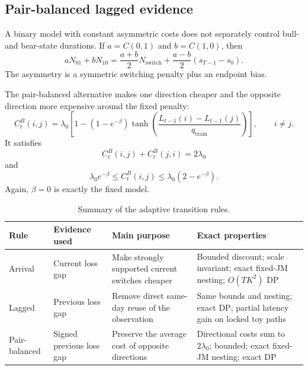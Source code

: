 \documentclass[11pt]{article}
\begin{document}
\subsection{Pair-balanced lagged evidence}

A binary model with constant asymmetric costs does not separately control bull- and bear-state durations. If $a=C(0,1)$ and $b=C(1,0)$, then
\begin{equation}
aN_{01}+bN_{10}
=\frac{a+b}{2}N_{\mathrm{switch}}
+\frac{a-b}{2}(s_{T-1}-s_0).
\label{eq:directedidentity}
\end{equation}
The asymmetry is a symmetric switching penalty plus an endpoint bias.

The pair-balanced alternative makes one direction cheaper and the opposite direction more expensive around the fixed penalty:
\begin{equation}
C_t^{B}(i,j)=\lambda_0\left[
1-(1-e^{-\beta})
\tanh\left(
\frac{L_{t-1}(i)-L_{t-1}(j)}{q_{\mathrm{train}}}
\right)\right],
\qquad i\neq j.
\label{eq:balanced}
\end{equation}
It satisfies
\begin{equation}
C_t^{B}(i,j)+C_t^{B}(j,i)=2\lambda_0
\end{equation}
and
\begin{equation}
\lambda_0e^{-\beta}\leq C_t^{B}(i,j)\leq\lambda_0(2-e^{-\beta}).
\end{equation}
Again, $\beta=0$ is exactly the fixed model.

\begin{table}[H]
\centering
\caption{Summary of the adaptive transition rules.}
\label{tab:rules}
\small
\begin{tabularx}{\textwidth}{l X X X}
\toprule
Rule & Evidence used & Main purpose & Exact properties \\
\midrule
Arrival & Current loss gap & Make strongly supported current switches cheaper & Bounded discount; scale invariant; exact fixed-JM nesting; $O(TK^2)$ DP \\
Lagged & Previous loss gap & Remove direct same-day reuse of the observation & Same bounds and nesting; exact DP; partial latency gain on locked toy paths \\
Pair-balanced & Signed previous loss gap & Preserve the average cost of opposite directions & Directional costs sum to $2\lambda_0$; bounded; exact fixed-JM nesting; exact DP \\
\bottomrule
\end{tabularx}
\end{table}
\end{document}
